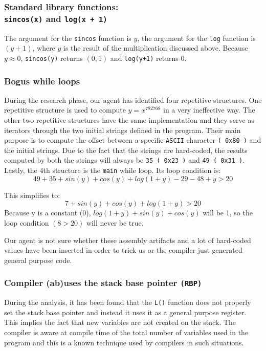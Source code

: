 \subsubsection{Standard library functions: \\ \texttt{sincos(x)} and \texttt{log(x + 1)}}
The argument for the \texttt{sincos} function is $y$, the argument for the \texttt{log} function is $(y + 1)$, where $y$ is the result of the multiplication discussed above. Because $y \approx 0$, \texttt{sincos(y)} returns $(0,1)$ and \texttt{log(y+1)} returns $0$.
\subsubsection{Bogus while loops}
During the research phase, our agent has identified four repetitive structures. One repetitive structure is used to compute $y = x^{782768}$ in a very ineffective way. The other two repetitive structures have the same implementation and they serve as iterators through the two initial strings defined in the program. Their main purpose is to compute the offset between a specific \texttt{ASCII} character \texttt{( 0x80 )} and the initial strings. Due to the fact that the strings are hard-coded, the results computed by both the strings will always be \texttt{35 ( 0x23 )} and \texttt{49 ( 0x31 )}.
Lastly, the 4th structure is the \texttt{main} while loop. Its loop condition is:
$$49 + 35 + sin(y) + cos(y) + log(1+y) - 29 - 48 + y > 20$$

This simplifies to:
$$7 + sin(y) + cos(y) + log(1+y) > 20$$
Because y is a constant (0), $log(1+y) + sin(y) + cos(y)$ will be 1, so the loop condition $(8 > 20)$ will never be true.

Our agent is not sure whether these assembly artifacts and a lot of hard-coded values have been inserted in order to trick us or the compiler just generated general purpose code.

\subsubsection{Compiler (ab)uses the stack base pointer \texttt{(RBP)}}
During the analysis, it has been found that the \texttt{L()} function does not properly set the stack base pointer and instead it uses it as a general purpose register. This implies the fact that new variables are not created on the stack. The compiler is aware at compile time of the total number of variables used in the program and this is a known technique used by compilers in such situations.

